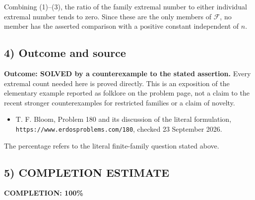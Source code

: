 Combining (1)--(3), the ratio of the family extremal number to either
individual extremal number tends to zero. Since these are the only
members of $\mathcal F$, no member has the asserted comparison with
a positive constant independent of $n$.

\subsection{4) Outcome and source}
\textbf{Outcome: SOLVED by a counterexample to the stated assertion.}
Every extremal count needed here is proved directly. This is an
exposition of the elementary example reported as folklore on the problem
page, not a claim to the recent stronger counterexamples for restricted
families or a claim of novelty.
\begin{itemize}
\item T. F. Bloom, Problem 180 and its discussion of the literal
formulation, \texttt{https://www.erdosproblems.com/180}, checked
23 September 2026.
\end{itemize}
The percentage refers to the literal finite-family question stated above.
\subsection{5) COMPLETION ESTIMATE}
\textbf{COMPLETION: 100\%}
